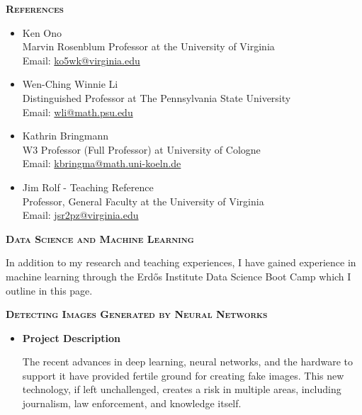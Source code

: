 \documentclass[11pt]{amsart}
\theoremstyle{remark}
\begin{document}
{\large{\textbf{\textsc{References}}}

\begin{itemize}
	\item {Ken Ono  \\
		Marvin Rosenblum Professor at the University of Virginia \\
	\large{Email: \href{mailto:ko5wk@virginia.edu}{ko5wk@virginia.edu}}}
	\vspace{.1in}
	\item {{Wen-Ching Winnie Li \\
		Distinguished Professor at The Pennsylvania State University} \\
	\large{Email: \href{mailto:wli@math.psu.edu}{wli@math.psu.edu}}}
		\vspace{.1in}
	\item {{Kathrin Bringmann \\
			W3 Professor (Full Professor) at University of Cologne} \\
		\large{Email: \href{mailto:kbringma@math.uni-koeln.de}{kbringma@math.uni-koeln.de}}}
			\vspace{.1in}
	\item {{ Jim Rolf - Teaching Reference  \\
			Professor, General Faculty at the University of Virginia} \\
		\large{Email: \href{mailto:jsr2pz@virginia.edu}{jsr2pz@virginia.edu}}}
	
\end{itemize}

\newpage

\large{\textbf{\textsc{Data Science and Machine Learning}}}

In addition to my research and teaching experiences, I have gained experience in machine learning through the Erdős Institute Data Science Boot Camp which I outline in this page.

\normalsize{\textbf{\textsc{Detecting Images Generated by Neural Networks}}}

\begin{itemize}
	
	\item {\bf Project Description}
	
	The recent advances in deep learning, neural networks, and the hardware to support it have provided fertile ground for creating fake images. This new technology, if left unchallenged, creates a risk in multiple areas, including journalism, law enforcement, and knowledge itself.
	

\end{itemize}}
\end{document}
